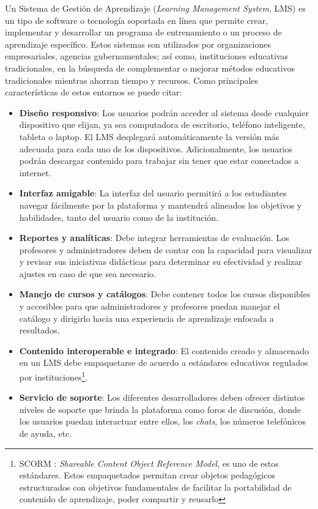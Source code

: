 Un Sistema de Gestión de Aprendizaje (\textit{Learning Management System}, LMS) es un tipo de software o tecnología soportada en línea que permite crear, implementar y desarrollar un programa de entrenamiento o un proceso de aprendizaje específico. Estos sistemas son utilizados por organizaciones empresariales, agencias gubernamentales; así como, instituciones educativas tradicionales, en la búsqueda de complementar o mejorar métodos educativos tradicionales mientras ahorran tiempo y recursos. Como principales características de estos entornos se puede citar: 
\begin{itemize}
    \item \textbf{Diseño responsivo}: Los usuarios podrán acceder al sistema desde cualquier dispositivo que elijan, ya sea computadora de escritorio, teléfono inteligente, tableta o laptop. El LMS desplegará automáticamente la versión más adecuada para cada uno de los dispositivos. Adicionalmente, los usuarios podrán descargar contenido para trabajar sin tener que estar conectados a internet.
    \item \textbf{Interfaz amigable}: La interfaz del usuario permitirá a los estudiantes navegar fácilmente por la plataforma y mantendrá alineados los objetivos y habilidades, tanto del usuario como de la institución.
    \item \textbf{Reportes y analíticas}: Debe integrar herramientas de evaluación. Los profesores y administradores deben de contar con la capacidad para visualizar y revisar sus iniciativas didácticas para determinar su efectividad y realizar ajustes en caso de que sea necesario.
    \item \textbf{Manejo de cursos y catálogos}: Debe contener todos los cursos disponibles y accesibles para que administradores y profesores puedan manejar el catálogo y dirigirlo hacia una experiencia de aprendizaje enfocada a resultados.
    \item \textbf{Contenido interoperable e integrado}: El contenido creado y almacenado en un LMS debe empaquetarse de acuerdo a estándares educativos regulados por instituciones\footnote[1]{SCORM : \textit{Shareable Content Object Reference Model}, es uno de estos estándares. Estos empaquetados permitan crear objetos pedagógicos estructurados con objetivos fundamentales de facilitar la portabilidad de contenido de aprendizaje, poder compartir y reusarlo}.
    \item \textbf{Servicio de soporte}: Los diferentes desarrolladores deben ofrecer distintos niveles de soporte que brinda la plataforma como foros de discusión, donde los usuarios puedan interactuar entre ellos, los \textit{chats}, los números telefónicos de ayuda, etc.
\end{itemize}

